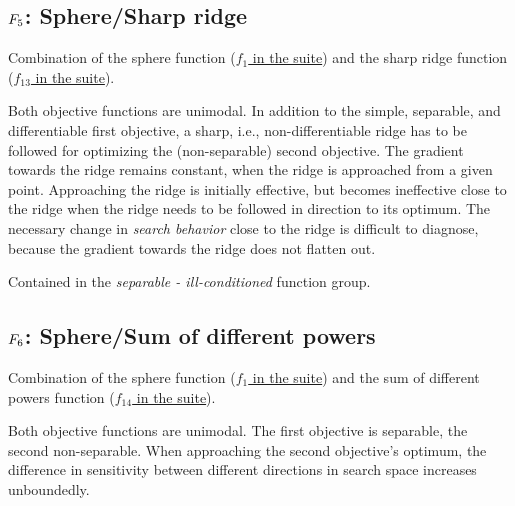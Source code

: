 \subsection[\texorpdfstring{\protect\(F_5\protect\): Sphere/Sharp ridge}{F5: Sphere/Sharp ridge}]{\texorpdfstring{\protect\(F_5\protect\): Sphere/Sharp ridge}{}}
\label{index:sphere-sharp-ridge}\label{index:f5}
Combination of the sphere function (\href{https://coco.gforge.inria.fr/downloads/download16.00/bbobdocfunctions.pdf\#page=5}{\(f_1\) in the \bbob suite})
and the sharp ridge function (\href{https://coco.gforge.inria.fr/downloads/download16.00/bbobdocfunctions.pdf\#page=65}{\(f_{13}\) in the \bbob suite}).

Both objective functions are unimodal.
In addition to the simple, separable, and differentiable first
objective, a sharp, i.e., non-differentiable ridge has to be
followed for optimizing the (non-separable) second objective. The
gradient towards the ridge remains constant, when the ridge is
approached from a given point.
Approaching the ridge is initially effective, but becomes ineffective
close to the ridge when the ridge needs to be followed in direction
to its optimum.  The necessary change in \emph{search behavior} close to
the ridge is difficult to diagnose, because the gradient
towards the ridge does not flatten out.

Contained in the \emph{separable - ill-conditioned} function group.



\subsection[\texorpdfstring{\protect\(F_6\protect\): Sphere/Sum of different powers}{F6: Sphere/Sum of different powers}]{\texorpdfstring{\protect\(F_6\protect\): Sphere/Sum of different powers}{}}
\label{index:sphere-sum-of-different-powers}\label{index:f6}
Combination of the sphere function (\href{https://coco.gforge.inria.fr/downloads/download16.00/bbobdocfunctions.pdf\#page=5}{\(f_1\) in the \bbob suite})
and the sum of different powers function (\href{https://coco.gforge.inria.fr/downloads/download16.00/bbobdocfunctions.pdf\#page=70}{\(f_{14}\) in the \bbob suite}).

Both objective functions are unimodal. The first objective is
separable, the second non-separable.
When approaching the second objective's optimum, the difference
in sensitivity between different directions in search space
increases unboundedly.

